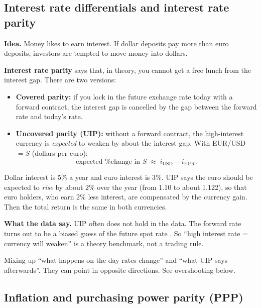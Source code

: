 \documentclass[11pt,a4paper]{article}
\begin{document}
\subsection{Interest rate differentials and interest rate parity}

\textbf{Idea.} Money likes to earn interest. If dollar deposits pay more
than euro deposits, investors are tempted to move money into dollars.

\textbf{Interest rate parity} says that, in theory, you cannot get a free
lunch from the interest gap. There are two versions:

\begin{itemize}
  \item \textbf{Covered parity:} if you lock in the future exchange rate
    today with a forward contract, the interest gap is cancelled by the gap
    between the forward rate and today's rate.
  \item \textbf{Uncovered parity (UIP):} without a forward contract, the
    high-interest currency is \emph{expected} to weaken by about the
    interest gap. With EUR/USD $=S$ (dollars per euro):
    \[
      \text{expected \% change in } S \;\approx\; i_{\text{USD}} - i_{\text{EUR}} .
    \]
\end{itemize}

\begin{fictive}
Dollar interest is 5\% a year and euro interest is 3\%. UIP says the euro
should be expected to \emph{rise} by about 2\% over the year
(from 1.10 to about 1.122), so that euro holders, who earn 2\% less
interest, are compensated by the currency gain. Then the total return is
the same in both currencies.
\end{fictive}

\textbf{What the data say.} UIP often does not hold in the data. The
forward rate turns out to be a biased guess of the future spot rate
\citep{fama1984}. So ``high interest rate = currency will weaken'' is a
theory benchmark, not a trading rule.

\begin{mistake}
Mixing up ``what happens on the day rates change'' and ``what UIP says
afterwards''. They can point in opposite directions. See overshooting below.
\end{mistake}

\subsection{Inflation and purchasing power parity (PPP)}
\end{document}
